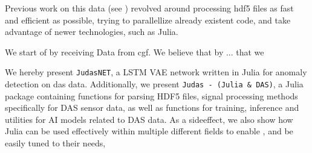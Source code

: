 Previous work on this data (see \cite{projthesis}) revolved around processing \acrshort{hdf5} files as fast and efficient as possible, trying to parallellize already existent code, and take advantage of newer technologies, such as Julia.


We start of by receiving Data from \acrlong{cgf}. We believe that by ... that we 



We hereby present \texttt{JudasNET}, a LSTM VAE network written in Julia for anomaly detection on \acrshort{das} data. Additionally, we present \texttt{Judas - (Julia \& DAS)}, a Julia package containing functions for parsing HDF5 files, signal processing methods specifically for DAS sensor data, as well as functions for training, inference and utilities for AI models related to DAS data. As a sideeffect, we also show how Julia can be used effectively within multiple different fields to enable , and be easily tuned to their needs,